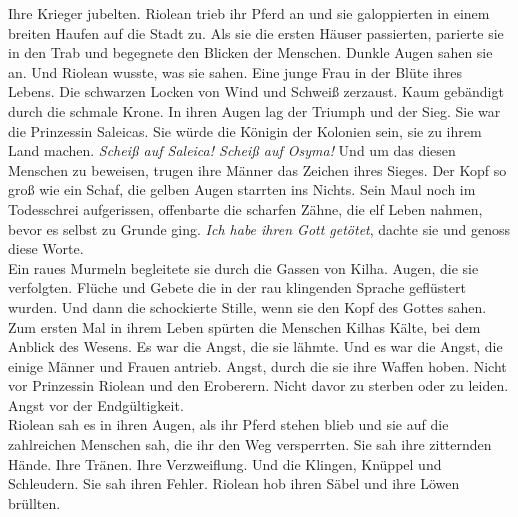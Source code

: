 Ihre Krieger jubelten. Riolean trieb ihr Pferd an und sie galoppierten in einem breiten Haufen 
auf die Stadt zu. Als sie die ersten Häuser passierten, parierte sie in den Trab und begegnete den 
Blicken der Menschen. Dunkle Augen sahen sie an. Und Riolean wusste, was sie sahen. Eine junge Frau 
in der Blüte ihres Lebens. Die schwarzen Locken von Wind und Schweiß zerzaust. Kaum gebändigt durch 
die schmale Krone. In ihren Augen lag der Triumph und der Sieg. Sie war die Prinzessin Saleicas. 
Sie würde die Königin der Kolonien sein, sie zu ihrem Land machen. \textit{Scheiß auf Saleica! 
Scheiß auf Osyma!}
Und um das diesen Menschen zu beweisen, trugen ihre Männer das Zeichen ihres Sieges. Der Kopf so 
groß wie ein Schaf, die gelben Augen starrten ins Nichts. Sein Maul noch im Todesschrei 
aufgerissen, offenbarte die scharfen Zähne, die elf Leben nahmen, bevor es selbst zu Grunde ging.
\textit{Ich habe ihren Gott getötet}, dachte sie und genoss diese Worte.\\
Ein raues Murmeln begleitete sie durch die Gassen von Kilha. Augen, die sie verfolgten. Flüche und 
Gebete die in der rau klingenden Sprache geflüstert wurden. Und dann die schockierte Stille, wenn 
sie den Kopf des Gottes sahen. Zum ersten Mal in ihrem Leben spürten die Menschen Kilhas Kälte, bei 
dem Anblick des Wesens. Es war die Angst, die sie lähmte. Und es war die Angst, die einige Männer 
und Frauen antrieb. Angst, durch die sie ihre Waffen hoben. Nicht vor Prinzessin Riolean und den 
Eroberern. Nicht davor zu sterben oder zu leiden. Angst vor der Endgültigkeit.\\
Riolean sah es in ihren Augen, als ihr Pferd stehen blieb und sie auf die zahlreichen Menschen sah, 
die ihr den Weg versperrten. Sie sah ihre zitternden Hände. Ihre Tränen. Ihre Verzweiflung. Und die 
Klingen, Knüppel und Schleudern. Sie sah ihren Fehler. Riolean hob ihren Säbel und ihre Löwen 
brüllten.